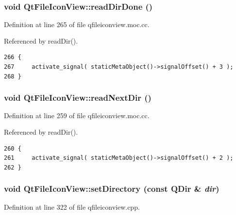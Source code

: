\subsubsection{\setlength{\rightskip}{0pt plus 5cm}void Qt\-File\-Icon\-View::read\-Dir\-Done ()\hspace{0.3cm}{\tt  [signal]}}\label{classQtFileIconView_QtFileIconViewl3}




Definition at line 265 of file qfileiconview.moc.cc.

Referenced by read\-Dir().



\footnotesize\begin{verbatim}266 {
267     activate_signal( staticMetaObject()->signalOffset() + 3 );
268 }
\end{verbatim}\normalsize 
{}
\subsubsection{\setlength{\rightskip}{0pt plus 5cm}void Qt\-File\-Icon\-View::read\-Next\-Dir ()\hspace{0.3cm}{\tt  [signal]}}\label{classQtFileIconView_QtFileIconViewl2}




Definition at line 259 of file qfileiconview.moc.cc.

Referenced by read\-Dir().



\footnotesize\begin{verbatim}260 {
261     activate_signal( staticMetaObject()->signalOffset() + 2 );
262 }
\end{verbatim}\normalsize 
{}
\subsubsection{\setlength{\rightskip}{0pt plus 5cm}void Qt\-File\-Icon\-View::set\-Directory (const QDir \& {\em dir})\hspace{0.3cm}{\tt  [slot]}}\label{classQtFileIconView_QtFileIconViewi1}




Definition at line 322 of file qfileiconview.cpp.

